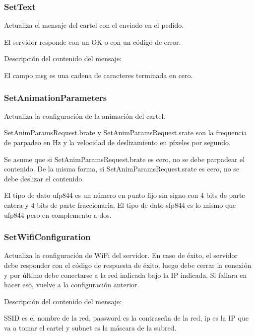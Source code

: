\subsubsection{SetText}
Actualiza el mensaje del cartel con el enviado en el pedido.

El servidor responde con un OK o con un código de error.

Descripción del contenido del mensaje:

El campo msg es una cadena de caracteres terminada en cero.

\subsubsection{SetAnimationParameters}
Actualiza la configuración de la animación del cartel.


SetAnimParamsRequest.brate y SetAnimParamsRequest.srate son la frequencia de parpadeo en Hz y la velocidad de deslizamiento en píxeles por segundo.

Se asume que si SetAnimParamsRequest.brate es cero, no se debe parpadear el contenido. De la misma forma, si SetAnimParamsRequest.srate es cero, no se debe deslizar el contenido.

El tipo de dato ufp844 es un número en punto fijo sin signo con 4 bits de parte entera y 4 bits de parte fraccionaria. El tipo de dato sfp844 es lo mismo que ufp844 pero en complemento a dos.

\subsubsection{SetWifiConfiguration}
Actualiza la configuración de WiFi del servidor. En caso de éxito, el servidor debe responder con el código de respuesta de éxito, luego debe cerrar la conexión y por último debe conectarse a la red indicada bajo la IP indicada. Si fallara en hacer eso, vuelve a la configuración anterior.

Descripción del contenido del mensaje:
%

SSID es el nombre de la red, password es la contraseña de la red, ip es la IP que va a tomar el cartel y subnet es la máscara de la subred.

